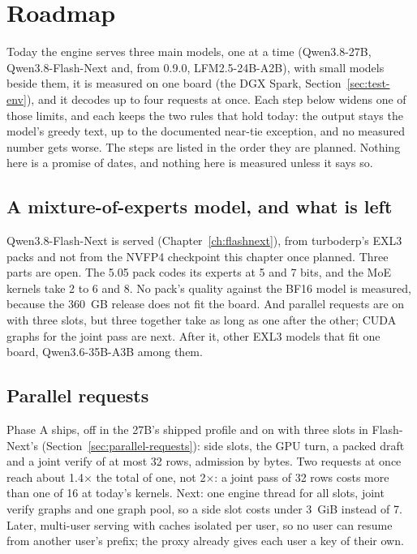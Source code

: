 \chapter{Roadmap}\label{ch:roadmap}

Today the engine serves three main models, one at a time (Qwen3.8-27B, Qwen3.8-Flash-Next and, from 0.9.0, LFM2.5-24B-A2B), with small models beside them, it is measured on one board (the DGX Spark, Section~\ref{sec:test-env}), and it decodes up to four requests at once. Each step below widens one of those limits, and each keeps the two rules that hold today: the output stays the model's greedy text, up to the documented near-tie exception, and no measured number gets worse. The steps are listed in the order they are planned. Nothing here is a promise of dates, and nothing here is measured unless it says so.

\section{A mixture-of-experts model, and what is left}

Qwen3.8-Flash-Next is served (Chapter~\ref{ch:flashnext}), from turboderp's EXL3 packs and not from the NVFP4 checkpoint this chapter once planned. Three parts are open. The 5.05 pack codes its experts at 5 and 7 bits, and the MoE kernels take 2 to 6 and 8. No pack's quality against the BF16 model is measured, because the 360~GB release does not fit the board. And parallel requests are on with three slots, but three together take as long as one after the other; CUDA graphs for the joint pass are next. After it, other EXL3 models that fit one board, Qwen3.6-35B-A3B among them.

\section{Parallel requests}

Phase A ships, off in the 27B's shipped profile and on with three slots in Flash-Next's (Section~\ref{sec:parallel-requests}): side slots, the GPU turn, a packed draft and a joint verify of at most 32 rows, admission by bytes. Two requests at once reach about 1.4$\times$ the total of one, not 2$\times$: a joint pass of 32 rows costs more than one of 16 at today's kernels. Next: one engine thread for all slots, joint verify graphs and one graph pool, so a side slot costs under 3~GiB instead of 7. Later, multi-user serving with caches isolated per user, so no user can resume from another user's prefix; the proxy already gives each user a key of their own.

